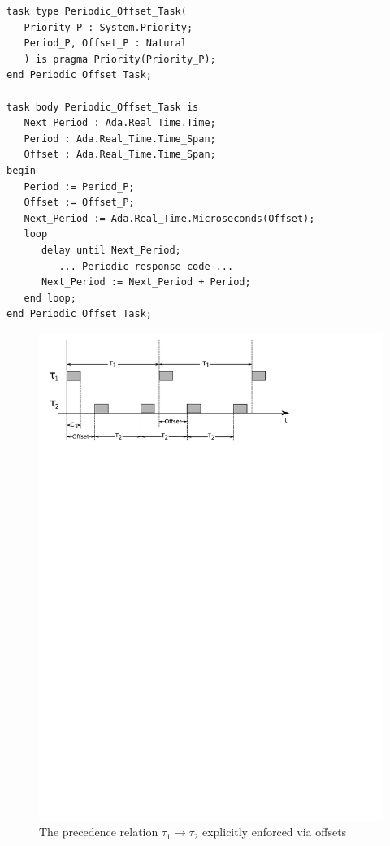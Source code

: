 \begin{minipage}{\listingwidth}
\lstset{language=ada,
  numbers=left,
  numberstyle=\tiny
}
\begin{lstlisting}[label=lst:starting_offset, caption=A periodic task
    with a starting offset of 70 msec]
task type Periodic_Offset_Task(
   Priority_P : System.Priority;
   Period_P, Offset_P : Natural
   ) is pragma Priority(Priority_P);
end Periodic_Offset_Task;

task body Periodic_Offset_Task is
   Next_Period : Ada.Real_Time.Time;
   Period : Ada.Real_Time.Time_Span;
   Offset : Ada.Real_Time.Time_Span;
begin
   Period := Period_P;
   Offset := Offset_P;
   Next_Period := Ada.Real_Time.Microseconds(Offset);
   loop
      delay until Next_Period;
      -- ... Periodic response code ...
      Next_Period := Next_Period + Period;
   end loop;
end Periodic_Offset_Task;
\end{lstlisting}
\end{minipage}

\begin{figure}
\centering
\includegraphics[scale=0.75]{figs/precedence_offset}
\caption{The precedence relation $\tau_1 \to \tau_2$ explicitly
  enforced via offsets}
\label{fig:starting_offset}
\end{figure}

